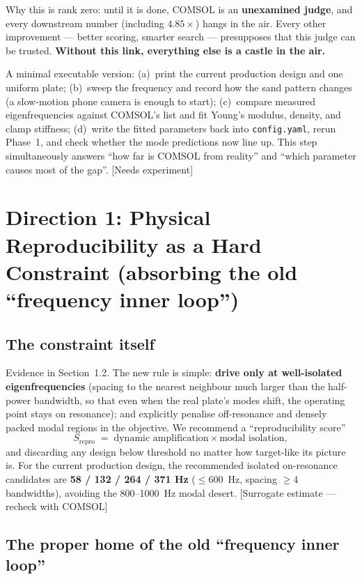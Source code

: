 \documentclass[11pt,a4paper]{article}
\newcommand{\code}[1]{\texttt{#1}}
\begin{document}
Why this is rank zero: until it is done, COMSOL is an \textbf{unexamined judge}, and every downstream number (including $4.85\times$) hangs in the air. Every other improvement --- better scoring, smarter search --- presupposes that this judge can be trusted. \textbf{Without this link, everything else is a castle in the air.}

A minimal executable version: (a)~print the current production design and one uniform plate; (b)~sweep the frequency and record how the sand pattern changes (a slow-motion phone camera is enough to start); (c)~compare measured eigenfrequencies against COMSOL's list and fit Young's modulus, density, and clamp stiffness; (d)~write the fitted parameters back into \code{config.yaml}, rerun Phase~1, and check whether the mode predictions now line up. This step simultaneously answers ``how far is COMSOL from reality'' and ``which parameter causes most of the gap''. [Needs experiment]

\section{Direction 1: Physical Reproducibility as a Hard Constraint (absorbing the old ``frequency inner loop'')}

\subsection{The constraint itself}

Evidence in Section~1.2. The new rule is simple: \textbf{drive only at well-isolated eigenfrequencies} (spacing to the nearest neighbour much larger than the half-power bandwidth, so that even when the real plate's modes shift, the operating point stays on resonance); and explicitly penalise off-resonance and densely packed modal regions in the objective. We recommend a ``reproducibility score''
\begin{equation}
S_{\mathrm{repro}} \;=\; \text{dynamic amplification} \times \text{modal isolation},
\end{equation}
and discarding any design below threshold no matter how target-like its picture is. For the current production design, the recommended isolated on-resonance candidates are \textbf{58 / 132 / 264 / 371 Hz} ($\le 600$~Hz, spacing $\ge 4$ bandwidths), avoiding the 800--1000~Hz modal desert. [Surrogate estimate --- recheck with COMSOL]

\subsection{The proper home of the old ``frequency inner loop''}
\end{document}
